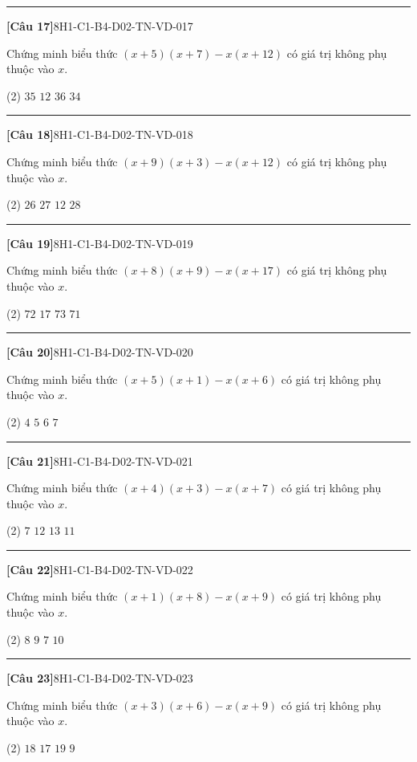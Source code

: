 \documentclass[12pt,a4paper]{article}
\newif\ifloigiai
\newenvironment{cauhoi}[2]{%
  \par\medskip\noindent\rule{\textwidth}{0.4pt}\par\nopagebreak
  \noindent\textbf{[#1]}\hfill{\scriptsize\ttfamily #2}\par\nopagebreak\smallskip}{\par}
\newcommand{\dapan}[1]{\ifloigiai\par\smallskip\noindent\textit{Đáp án:} \textbf{#1}\par\fi}
\begin{document}
\begin{cauhoi}{Câu 17}{8H1-C1-B4-D02-TN-VD-017}
Chứng minh biểu thức $(x+5)(x+7)-x(x+12)$ có giá trị không phụ thuộc vào $x$.
\begin{tasks}(2)
\task $35$
\task $12$
\task $36$
\task $34$
\end{tasks}
\dapan{A}
\end{cauhoi}
\begin{cauhoi}{Câu 18}{8H1-C1-B4-D02-TN-VD-018}
Chứng minh biểu thức $(x+9)(x+3)-x(x+12)$ có giá trị không phụ thuộc vào $x$.
\begin{tasks}(2)
\task $26$
\task $27$
\task $12$
\task $28$
\end{tasks}
\dapan{B}
\end{cauhoi}
\begin{cauhoi}{Câu 19}{8H1-C1-B4-D02-TN-VD-019}
Chứng minh biểu thức $(x+8)(x+9)-x(x+17)$ có giá trị không phụ thuộc vào $x$.
\begin{tasks}(2)
\task $72$
\task $17$
\task $73$
\task $71$
\end{tasks}
\dapan{A}
\end{cauhoi}
\begin{cauhoi}{Câu 20}{8H1-C1-B4-D02-TN-VD-020}
Chứng minh biểu thức $(x+5)(x+1)-x(x+6)$ có giá trị không phụ thuộc vào $x$.
\begin{tasks}(2)
\task $4$
\task $5$
\task $6$
\task $7$
\end{tasks}
\dapan{B}
\end{cauhoi}
\begin{cauhoi}{Câu 21}{8H1-C1-B4-D02-TN-VD-021}
Chứng minh biểu thức $(x+4)(x+3)-x(x+7)$ có giá trị không phụ thuộc vào $x$.
\begin{tasks}(2)
\task $7$
\task $12$
\task $13$
\task $11$
\end{tasks}
\dapan{B}
\end{cauhoi}
\begin{cauhoi}{Câu 22}{8H1-C1-B4-D02-TN-VD-022}
Chứng minh biểu thức $(x+1)(x+8)-x(x+9)$ có giá trị không phụ thuộc vào $x$.
\begin{tasks}(2)
\task $8$
\task $9$
\task $7$
\task $10$
\end{tasks}
\dapan{A}
\end{cauhoi}
\begin{cauhoi}{Câu 23}{8H1-C1-B4-D02-TN-VD-023}
Chứng minh biểu thức $(x+3)(x+6)-x(x+9)$ có giá trị không phụ thuộc vào $x$.
\begin{tasks}(2)
\task $18$
\task $17$
\task $19$
\task $9$
\end{tasks}
\dapan{A}
\end{cauhoi}
\end{document}
